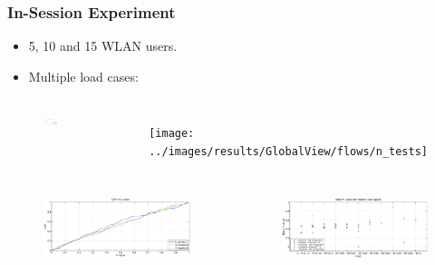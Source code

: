 \documentclass[9pt,handout,serif]{beamer}
\begin{document}
\begin{frame}[c]
	\frametitle{In-Session Experiment}
	\begin{itemize}
		\item 5, 10 and 15 WLAN users.
		\item Multiple load cases:
	\end{itemize}
	\begin{columns}
		\centering
			\begin{figure}
				\centering
				\includegraphics[width=1\textwidth]{../images/results/GlobalView/flows/cdf_load}
			\end{figure}
			\begin{figure}
				\centering
				\texttt{[image: ../images/results/GlobalView/flows/n\_tests]}
			\end{figure}
	\end{columns}
	
	\begin{columns}
		\centering
		\column{.5\textwidth}
			\begin{figure}
				\centering
				\includegraphics[width=1\textwidth]{../images/results/GlobalView/flows/cdf_p}
			\end{figure}
			\column{.5\textwidth}
			\begin{figure}
				\centering
				\includegraphics[width=1\textwidth]{../images/results/GlobalView/flows/load_vs_p}
			\end{figure}
	\end{columns}
\end{frame}
\end{document}
